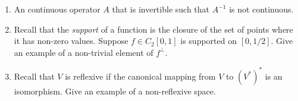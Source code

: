 \documentclass[12pt,letterpaper,reqno]{amsart}
\begin{document}
\begin{enumerate}[1.]
\item An continuous operator $A$ that is invertible such that $A^{-1}$ is not continuous.
\item Recall that the \emph{support} of a function is the closure of the set of points where it has non-zero values. Suppose $f\in C_2[0,1]$ is supported on $[0,1/2]$. Give an example of a non-trivial element of $f^\perp$.
\item Recall that $V$ is reflexive if the canonical mapping from $V$ to $(V^*)^*$ is an isomorphism. Give an example of a non-reflexive space.
\end{enumerate}
\end{document}
